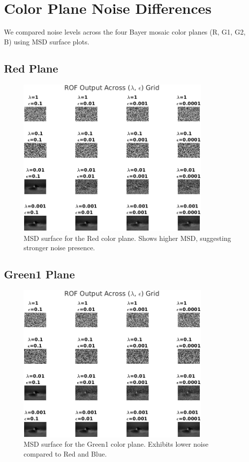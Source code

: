 \documentclass[11pt]{article}
\begin{document}
\section*{Color Plane Noise Differences}

We compared noise levels across the four Bayer mosaic color planes (R, G1, G2, B) using MSD surface plots.

\subsection*{Red Plane}
\begin{figure}[h!]
\centering
\includegraphics[width=0.85\textwidth]{../test/results/rof_grid_plane_R.png}
\caption{MSD surface for the Red color plane. Shows higher MSD, suggesting stronger noise presence.}
\end{figure}
\clearpage

\subsection*{Green1 Plane}
\begin{figure}[h!]
\centering
\includegraphics[width=0.85\textwidth]{../test/results/rof_grid_plane_G1.png}
\caption{MSD surface for the Green1 color plane. Exhibits lower noise compared to Red and Blue.}
\end{figure}
\clearpage
\end{document}
